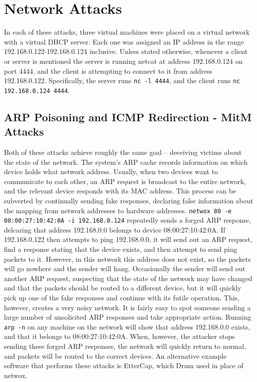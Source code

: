 \section{Network Attacks}


In each of these attacks, three virtual machines were placed on a virtual network with a virtual DHCP server. Each one
was assigned an IP address in the range 192.168.0.122-192.168.0.124 inclusive. Unless stated otherwise, whenever a
client or server is mentioned the server is running netcat at address 192.168.0.124 on port 4444, and the client is
attempting to connect to it from address 192.168.0.122. Specifically, the server runs {\tt nc -l 4444}, and the
client runs {\tt nc 192.168.0.124 4444}.

\subsection{ARP Poisoning and ICMP Redirection - MitM Attacks}

Both of these attacks achieve roughly the same goal -- deceiving victims about the state of the network. The system's
ARP cache records information on which device holds what network address. Usually, when two devices want to communicate
to each other, an ARP request is broadcast to the entire network, and the relevant device responds with its MAC address.
This process can be subverted by continually sending fake responses, declaring false information about the mapping from
network addresses to hardware addresses. {\tt netwox 80 -e 08:00:27:10:42:0A -i 192.168.0.124} repeatedly sends a forged
ARP response, delcaring that address 192.168.0.0 belongs to device 08:00:27:10:42:0A. If 192.168.0.122 then attempts to
ping 192.168.0.0, it will send out an ARP request, find a response stating that the device exists, and then attempt to
send ping packets to it. However, in this network this address does not exist, so the packets will go nowhere and the
sender will hang. Occasionally the sender will send out another ARP request, suspecting that the state of the network
may have changed and that the packets should be routed to a different device, but it will quickly pick up one of the
fake responses and continue with its futile operation. This, however, creates a very noisy network. It is fairly easy to
spot someone sending a large number of unsolicited ARP responses and take appropriate action. Running {\tt arp -n} on
any machine on the network will show that address 192.168.0.0 exists, and that it belongs to 08:00:27:10:42:0A. When,
however, the attacker stops sending these forged ARP responses, the network will quickly return to normal, and packets
will be routed to the correct devices.
An alternative example software that performs these attacks is EtterCap, which Drum used in place of netwox.

